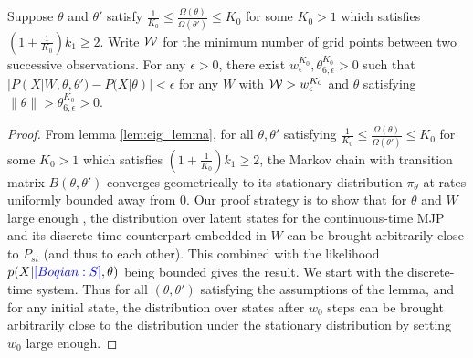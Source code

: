   \begin{lemma}
  Suppose $\theta$ and $\theta'$ satisfy $\frac{1}{K_0} \le \frac{\Omega(\theta)}{\Omega(\theta')} \leq K_0
  $ for some $K_0 > 1$ which satisfies $(1 + \frac{1}{K_0})k_1 \ge 2$. Write ${\mathcal W}$ for the
  minimum number of grid points between two successive observations.
  For any $\epsilon > 0$, there exist  $w^{K_0}_\epsilon,  \theta_{6, \epsilon}^{K_0} > 0$ such that
  $|P(X| W, \theta, \theta') - P(X | \theta)| < \epsilon$
  for any $W$ with ${\mathcal W} > w^{K_0}_\epsilon$ and $\theta $ satisfying $\| \theta \| > \theta_{6, \epsilon}^{K_0} > 0$.
  \label{lem:eigenvalue_lemma}
  \end{lemma}
  \begin{proof}
%
{From lemma \ref{lem:eig_lemma}, for all $\theta, \theta'$ satisfying $\frac{1}{K_0} \le \frac{\Omega(\theta)}{\Omega(\theta')} \leq K_0$ for some $K_0 > 1$ which satisfies $(1 + \frac{1}{K_0})k_1 \ge 2$, the Markov chain with transition matrix $B(\theta, \theta')$ converges geometrically to its stationary distribution $\pi_\theta$ at rates uniformly bounded away from 0.
}
Our proof strategy is to show that for $\theta$ and $W$ large enough , the
distribution over latent states for the continuous-time MJP and
its discrete-time counterpart embedded in $W$ can be brought arbitrarily
close to $P_{st}$ (and thus to each other). This combined with the
likelihood $p(X|\textcolor{blue}{[Boqian: S]}, \theta)$ being bounded  gives the result.
We start with the discrete-time system.
Thus for all $(\theta,\theta')$ satisfying the assumptions of the lemma,
and for any initial state, the distribution over states after $w_{0}$ steps
can be brought arbitrarily close to the distribution under the
stationary distribution by setting $w_{0}$ large enough.



\end{proof}
